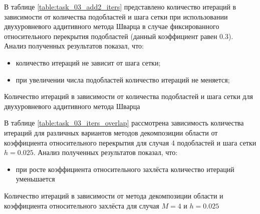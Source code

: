 \documentclass[a4paper]{article}
\begin{document}
\newpage

В таблице \ref{table:task_03_add2_iters} представлено количество итераций в зависимости от количества подобластей и шага сетки при использовании двухуровневого аддитивного метода Шварца в случае фиксированного относительного перекрытия подобластей (данный коэффициент равен 0.3). Анализ полученных результатов показал, что:
\begin{itemize}
\item количество итераций не зависит от шага сетки;
\item при увеличении числа подобластей количество итераций не меняется;
\end{itemize}

\begin{table}[h]
\caption{Количество итераций в зависимости от количества подобластей и шага сетки для двухуровневого аддитивного метода Шварца}
\label{table:task_03_add2_iters_coarse_1}
\end{table}

В таблице \ref{table:task_03_iters_overlap} рассмотрена зависимость количества итераций для различных вариантов методов декомпозиции области от коэффициента относительного перекрытия для случая 4 подобластей и шага сетки $h = 0.025$. Анализ полученных результатов показал, что:
\begin{itemize}
\item при росте коэффициента относительного захлёста количество итераций уменьшается
\end{itemize}

\begin{table}[h]
\caption{Количество итераций в зависимости от метода декомпозиции области и коэффициента относительного захлёста для случая $M = 4$ и $h = 0.025$}
\label{table:task_03_iters_overlap_coarse_1}
\end{table}
\end{document}
